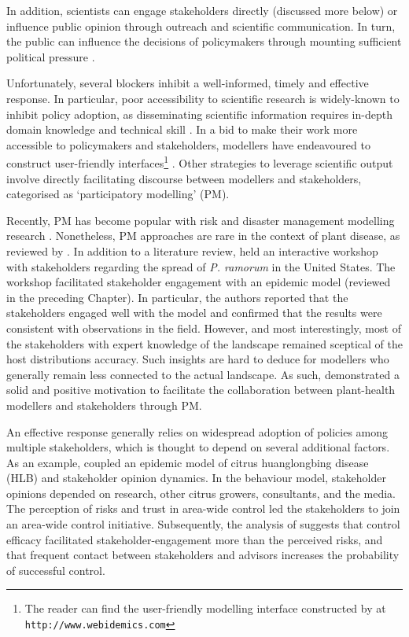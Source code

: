 In addition, scientists can engage stakeholders directly (discussed more below) or influence public opinion through outreach and
scientific communication. In turn, the public can influence the decisions of policymakers through
mounting sufficient political pressure \cite{fuller2016public}.

Unfortunately, several blockers inhibit a well-informed, timely and effective response. 
In particular, poor accessibility to scientific research is widely-known to inhibit policy adoption, 
as disseminating scientific information requires in-depth domain knowledge and technical skill \cite{jones2020modelling}.
In a bid to make their work more accessible to policymakers and stakeholders, modellers have endeavoured to construct user-friendly interfaces\footnote{
The reader can find the user-friendly modelling interface constructed by \cite{WEBIDEMICS} at \nolinkurl{http://www.webidemics.com}} \cite{WEBIDEMICS}.
Other strategies to leverage scientific output involve directly facilitating discourse between modellers and stakeholders, categorised as `participatory modelling' (PM).

Recently, PM has become popular with risk and disaster management modelling research \cite{hamalainen2020leadership, ravera2020participatory, hedelin2017participatory}.
Nonetheless, PM approaches are rare in the context of plant disease, as reviewed by \cite{gaydos2019forecasting}.
In addition to a literature review, \cite{gaydos2019forecasting} held an interactive workshop with stakeholders
regarding the spread of \textit{P. ramorum} in the United States. The workshop facilitated stakeholder engagement
with an epidemic model \cite{tonini2017tangible} (reviewed in the preceding Chapter). In particular, the authors reported
that the stakeholders engaged well with the model and confirmed that the results were consistent with observations in the field. However, and most interestingly, most of the stakeholders with expert knowledge of the landscape remained sceptical of the host distributions accuracy. 
Such insights are hard to deduce for modellers who generally remain less connected to the actual landscape. 
As such, \cite{tonini2017tangible} demonstrated a solid and positive motivation to facilitate the collaboration 
between plant-health modellers and stakeholders through PM.

An effective response generally relies on widespread adoption of policies among multiple 
stakeholders, which is thought to depend on several additional factors. As an example, \cite{milne2020makes} coupled
an epidemic model of citrus huanglongbing disease (HLB) and stakeholder opinion dynamics. In the behaviour model, stakeholder
opinions depended on research, other citrus growers, consultants, and the media. The perception of risks and trust in
area-wide control led the stakeholders to join an area-wide control initiative. Subsequently, the analysis of 
\cite{milne2020makes} suggests that control efficacy facilitated stakeholder-engagement more than the perceived risks,
and that frequent contact between stakeholders and advisors increases the probability of successful control.


